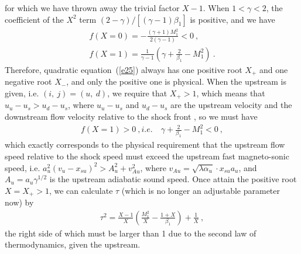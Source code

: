 \documentclass[fleqn,usenatbib]{mnras}
\begin{document}
for which we have thrown away the trivial factor $X-1$. When $1<\gamma<2$, the coefficient of the $X^{2}$ term  $(2-\gamma)/\left[(\gamma-1)\beta_{1}\right]$ is positive, and we have
\begin{gather}
f(X=0)=-\frac{(\gamma+1)M_{1}^{2}}{2(\gamma-1)}<0\ ,\label{e26}\\
f(X=1)=\frac{1}{\gamma-1}\left(\gamma+\frac{2}{\beta_{1}}-M_{1}^{2}\right)\ .\label{e27}
\end{gather}
Therefore, quadratic equation~(\ref{e25}) always has one positive root $X_{+}$ and one negative root $X_{-}$, and only the positive one is physical. When the upstream is given, i.e. $(i,\ j)=(u,\ d)$, we require that $X_{+}>1$, which means that $u_{u}-u_{s}>u_{d}-u_{s}$, where $u_{u}-u_{s}$ and $u_{d}-u_{s}$ are the upstream velocity and the downstream flow velocity relative to the shock front \citep{FM}, so we must have 
\begin{gather}
f(X=1)>0\ ,i.e.\quad \gamma+\frac{2}{\beta_{1}}-M_{1}^{2}<0\ ,\label{e28}
\end{gather}
which exactly corresponds to the physical requirement that the upstream flow speed relative to the shock speed must exceed the upstream fast magneto-sonic speed, i.e. $a_{u}^{2}\left(v_{u}-x_{su}\right)^{2}>A_{u}^{2}+v_{Au}^{2}$, where $v_{Au}=\sqrt{\lambda\alpha_{u}}\cdot x_{su}a_{u}$, and $A_{u}=a_{u}\gamma^{1/2}$ is the upstream adiabatic sound speed. Once attain the positive root $X=X_{+}>1$, we can calculate $\tau$ (which is no longer an adjustable parameter now) by
\begin{gather}
\tau^{2}=\frac{X-1}{X}\left(\frac{M_{1}^{2}}{X}-\frac{1+X}{\beta_{1}}\right)+\frac{1}{X}\ ,\label{e29}
\end{gather}
the right side of which must be larger than 1 due to the second law of thermodynamics, given the upstream.
\end{document}
